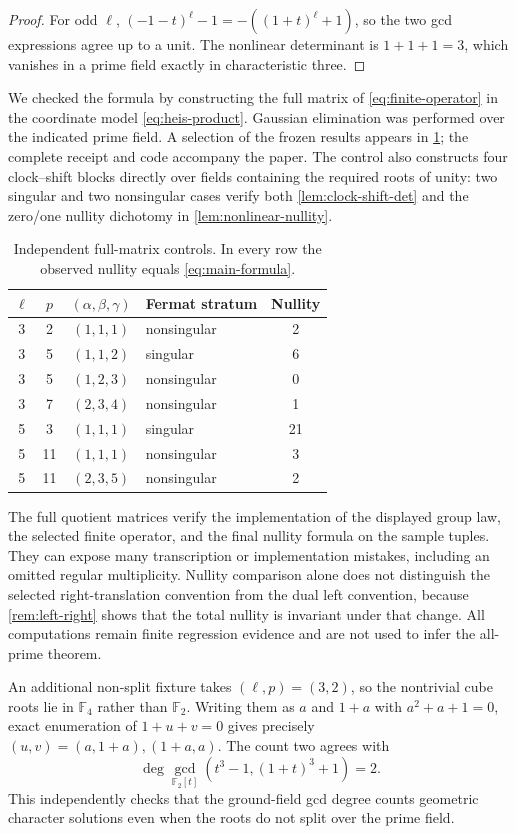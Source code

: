 \begin{proof}
For odd $\ell$,
$(-1-t)^\ell-1=-((1+t)^\ell+1)$, so the two gcd expressions agree up to a
unit.  The nonlinear determinant is $1+1+1=3$, which vanishes in a prime
field exactly in characteristic three.
\end{proof}

We checked the formula by constructing the full matrix of
\eqref{eq:finite-operator} in the coordinate model \eqref{eq:heis-product}.
Gaussian elimination was performed over the indicated prime field.  A
selection of the frozen results appears in \cref{tab:controls}; the complete
receipt and code accompany the paper.  The control also constructs four
clock--shift blocks directly over fields containing the required roots of
unity: two singular and two nonsingular cases verify both
\cref{lem:clock-shift-det} and the zero/one nullity dichotomy in
\cref{lem:nonlinear-nullity}.

\begin{table}[t]
\centering
\caption{Independent full-matrix controls.  In every row the observed
nullity equals \eqref{eq:main-formula}.}
\label{tab:controls}
\begin{tabular}{ccclc}
\toprule
$\ell$ & $p$ & $(\alpha,\beta,\gamma)$ & Fermat stratum & Nullity \\
\midrule
3 & 2  & $(1,1,1)$ & nonsingular & 2 \\
3 & 5  & $(1,1,2)$ & singular & 6 \\
3 & 5  & $(1,2,3)$ & nonsingular & 0 \\
3 & 7  & $(2,3,4)$ & nonsingular & 1 \\
5 & 3  & $(1,1,1)$ & singular & 21 \\
5 & 11 & $(1,1,1)$ & nonsingular & 3 \\
5 & 11 & $(2,3,5)$ & nonsingular & 2 \\
\bottomrule
\end{tabular}
\end{table}

The full quotient matrices verify the implementation of the displayed group
law, the selected finite operator, and the final nullity formula on the sample
tuples.  They can expose many transcription or implementation mistakes,
including an omitted regular multiplicity.  Nullity comparison alone does not
distinguish the selected right-translation convention from the dual left
convention, because \cref{rem:left-right} shows that the total nullity is
invariant under that change.  All computations remain finite regression
evidence and are not used to infer the all-prime theorem.

An additional non-split fixture takes $(\ell,p)=(3,2)$, so the nontrivial
cube roots lie in $\mathbb F_4$ rather than $\mathbb F_2$.  Writing them as
$a$ and $1+a$ with $a^2+a+1=0$, exact enumeration of $1+u+v=0$ gives
precisely $(u,v)=(a,1+a),(1+a,a)$.  The count two agrees with
\[
 \deg\gcd_{\mathbb F_2[t]}(t^3-1,(1+t)^3+1)=2.
\]
This independently checks that the ground-field gcd degree counts geometric
character solutions even when the roots do not split over the prime field.
